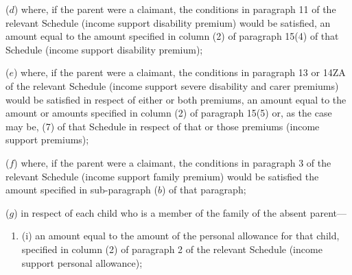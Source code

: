\documentclass[12pt,a4paper]{article}
\begin{document}
\begin{enumerate}
%
%

($d$) where, if the parent were a claimant, the conditions in paragraph 11 of the relevant Schedule (income support disability premium) would be satisfied, an amount equal to the amount specified in column (2) of paragraph 15(4) of that Schedule (income support disability premium);

($e$) where, if the parent were a claimant, the conditions in paragraph 13 or 14ZA of the relevant Schedule (income support severe disability and carer premiums) would be satisfied in respect of either or both premiums, an amount equal to the amount or amounts specified in column (2) of paragraph 15(5) or, as the case may be, (7) of that Schedule in respect of that or those premiums (income support premiums);

($f$) where, if the parent were a claimant, the conditions in paragraph 3 of the relevant Schedule (income support family premium) would be satisfied 
the amount specified in 
sub-paragraph ($b$) of  %
that paragraph;

($g$) in respect of each child who is a member of the family of the absent parent—
\begin{enumerate}\item[]
(i) an amount equal to the amount of the personal allowance for that child, specified in column (2) of paragraph 2 of the relevant Schedule (income support personal allowance);


\end{enumerate}
\end{enumerate}
\end{document}
